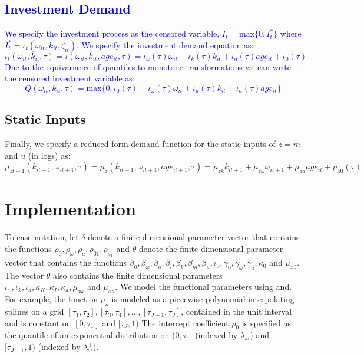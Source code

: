 \documentclass{article}
\begin{document}
\textcolor{blue}{
\subsection{Investment Demand}
We specify the investment process as the censored variable, $I_{t}=\text{max}\{0, I^{*}_{t}\}$ where $I_{t}^{*}=\iota_{t}(\omega_{it}, k_{it}, \zeta_{it})$. We specify the investment demand equation as:
\begin{equation}\label{imodel}
\iota_{t}(\omega_{it}, k_{it}, \tau)=\iota(\omega_{it}, k_{it}, age_{it}, \tau)=\iota_{\omega}(\tau)\omega_{it}+\iota_{k}(\tau)k_{it}+\iota_{a}(\tau)age_{it}+\iota_{0}(\tau)
\end{equation}
Due to the equivariance of quantiles to monotone transformations we can write the censored investment variable as:
\begin{equation}\label{censormodel}
Q(\omega_{it}, k_{it}, \tau)=\text{max}\{0, \iota_{0}(\tau)+\iota_{\omega}(\tau)\omega_{it}+\iota_{k}(\tau)k_{it}+\iota_{a}(\tau)age_{it}\}
\end{equation}}

\subsection{Static Inputs}
Finally, we specify a reduced-form demand function for the static inputs of $z=m$ and $u$ (in logs) as:
\begin{equation}\label{staticmodel}
\mu_{zt+1}(k_{it+1}, \omega_{it+1}, \tau)=\mu_{z}(k_{it+1}, \omega_{it+1}, age_{it+1}, \tau)=\mu_{zk}k_{it+1}+\mu_{z\omega}\omega_{it+1}+\mu_{za}age_{it}+\mu_{z0}(\tau)
\end{equation}

\section{Implementation}
To ease notation, let $\delta$ denote a finite dimensional parameter vector that contains the functions $\rho_{0},\rho_{\omega}, \rho_{a}, \rho_{01}, \rho_{a_{1}}$ and $\theta$ denote the finite dimensional parameter vector that contains the functions $\beta_{0}, \beta_{\omega}, \beta_{a}, \beta_{l}, \beta_{k}, \beta_{m}, \beta_{u}, \iota_{0}, \gamma_{0}, \gamma_{\omega}, \gamma_{a}, \kappa_{0}$ and $\mu_{x0}$. The vector $\theta$ also contains the finite dimensional parameters $\iota_{\omega}, \iota_{k}, \iota_{a}, \kappa_{K}, \kappa_{I}, \kappa_{a}, \mu_{xk}$ and $\mu_{xa}$. We model the functional parameters using \cite{Wei2009} and\cite{Arellano2016}. For example, the function $\rho_{\omega}$ is modeled as a piecewise-polynomial interpolating splines on a grid $[\tau_{1},\tau_{2}], [\tau_{3},\tau_{4}],\dots, [\tau_{J-1},\tau_{J}]$, contained in the unit interval and is constant on $[0, \tau_{1}]$ and $[\tau_{J}, 1)$ The intercept coefficient $\rho_{0}$ is specified as the quantile of an exponential distribution on $(0,\tau_{1}]$ (indexed by $\lambda_{\omega}^{-}$) and $[\tau_{J-1}, 1)$ (indexed by $\lambda_{\omega}^{+}$).\\
\end{document}
